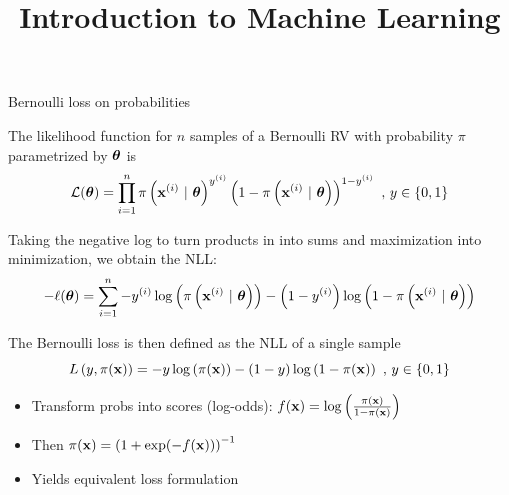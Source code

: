 \documentclass[11pt,compress,t,notes=noshow, xcolor=table]{beamer}
\title{Introduction to Machine Learning}
\begin{document}
    

\begin{vbframe}{Bernoulli loss on probabilities}

The likelihood function for $n$ samples of a Bernoulli RV with probability $\pi$ parametrized by $\bm{\theta}$ is
$$
\mathcal{L}(\bm{\theta}) = \prod\limits_{i=1}^n \pi\left(\mathbf{x}^{(i)} ~|~ \bm{\theta}\right)^{y^{(i)}} \left(1-\pi\left(\mathbf{x}^{(i)} ~|~ \bm{\theta}\right)\right)^{1-y^{(i)}} \,\,, \, y \in \{0, 1\}
$$

Taking the negative log to turn products in into sums and maximization into minimization, we obtain the NLL:
$$- \ell(\bm{\theta}) = \sum\limits_{i=1}^n - y^{(i)} \log\left(\pi\left(\mathbf{x}^{(i)} ~|~ \bm{\theta}\right)\right) - \left(1-y^{(i)}\right)\log\left(1-\pi\left(\mathbf{x}^{(i)} ~|~ \bm{\theta}\right)\right)$$

The Bernoulli loss is then defined as the NLL of a single sample
  $$
    L\left(y, \pi(\mathbf{x})\right) = - y \log \left(\pi(\mathbf{x})\right) - (1 - y) \log \left(1 - \pi(\mathbf{x})\right)\,\,, \, y \in \{0, 1\} 
  $$

\framebreak 

\begin{itemize}
    \item Transform probs into scores (log-odds): $f(\mathbf{x}) = \log\left(\frac{\pi(\mathbf{x})}{1 - \pi(\mathbf{x})}\right)$
    \item Then $\pi(\mathbf{x}) = \left(1 + \exp(-f(\mathbf{x}))\right)^{-1}$
    \item Yields equivalent loss formulation
\end{itemize}


\end{vbframe}
\end{document}
